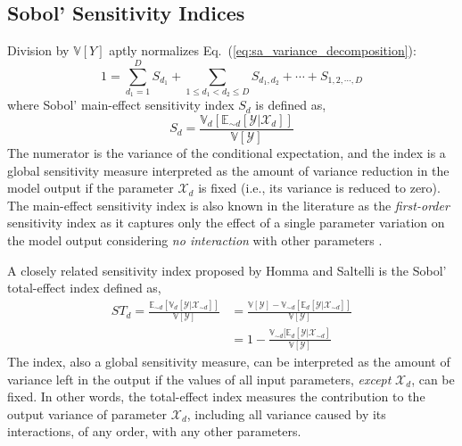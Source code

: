 \subsection{Sobol' Sensitivity Indices}\label{sub:sa_sobol_indices}

Division by $\mathbb{V}[Y]$ aptly normalizes Eq.~(\ref{eq:sa_variance_decomposition}):
\begin{equation}
  1 = \sum_{d_1 = 1}^{D} S_{d_1} + \sum_{1 \leq d_1 < d_2 \leq D} S_{d_1,d_2} + \cdots + S_{1,2,\cdots,D}
\label{eq:sa_normalized_variance}
\end{equation}
where Sobol' main-effect sensitivity index $S_d$ is defined as,
\begin{equation}
  S_d = \frac{\mathbb{V}_d [\mathbb{E}_{\sim d} [\mathcal{Y}|\mathcal{X}_d]]}{\mathbb{V}[\mathcal{Y}]}
\label{eq:sa_main_effect_index}
\end{equation}
The numerator is the variance of the conditional expectation,
and the index is a global sensitivity measure interpreted as the amount of variance reduction in the model output if the parameter $\mathcal{X}_d$ is fixed (i.e., its variance is reduced to zero).
The main-effect sensitivity index is also known in the literature as the \emph{first-order} sensitivity index 
as it captures only the effect of a single parameter variation on the model output considering \emph{no interaction} with other parameters \cite{Saltelli2002}.

A closely related sensitivity index proposed by Homma and Saltelli \cite{Homma1996} is the Sobol' total-effect index defined as,
\begin{equation}
  \begin{split}
    ST_{d} = \frac{\mathbb{E}_{\sim d}[\mathbb{V}_{d}[\mathcal{Y}|\bm{\mathcal{X}}_{\sim d}]]}{\mathbb{V}[\mathcal{Y}]}
           & = \frac{\mathbb{V}[\mathcal{Y}] - \mathbb{V}_{\sim d}\left[\mathbb{E}_{d}\left[\mathcal{Y}|\bm{\mathcal{X}}_{\sim d}\right]\right]}{\mathbb{V}[\mathcal{Y}]} \\
           & = 1 - \frac{\mathbb{V}_{\sim d}[\mathbb{E}_{d}[\mathcal{Y}|\bm{\mathcal{X}}_{\sim d}]}{\mathbb{V}[\mathcal{Y}]}
  \end{split}
\label{eq:sa_total_effect_index}
\end{equation}
The index, also a global sensitivity measure, can be interpreted as the amount of variance left in the output if the values of all input parameters, \emph{except} $\mathcal{X}_d$, can be fixed.
In other words, the total-effect index measures the contribution to the output variance of parameter $\mathcal{X}_d$, including all variance caused by its interactions, of any order, with any other parameters.

